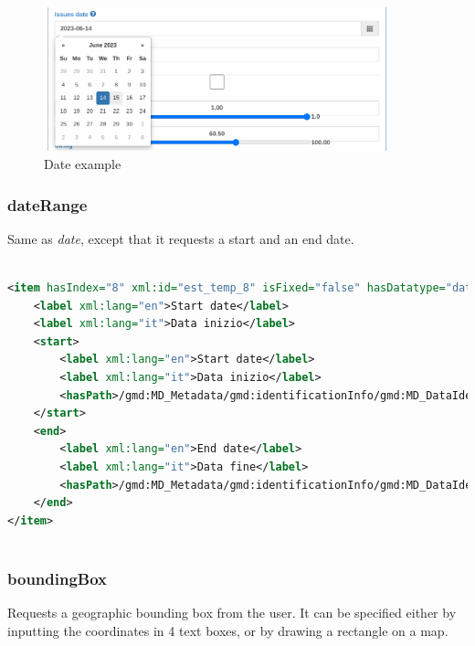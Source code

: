\documentclass[10pt]{article}
\begin{document}
\begin{figure}[h]
	\caption{Date example}
	\includegraphics[width=10cm]{Date.png}
	\centering
\end{figure}


\subsubsection{dateRange}
\label{dateRange}

Same as \textit{date}, except that it requests a start and an end date.

\begin{lstlisting}[language=xml]
	
<item hasIndex="8" xml:id="est_temp_8" isFixed="false" hasDatatype="dateRange">
	<label xml:lang="en">Start date</label>
	<label xml:lang="it">Data inizio</label>
	<start>
		<label xml:lang="en">Start date</label>
		<label xml:lang="it">Data inizio</label>
		<hasPath>/gmd:MD_Metadata/gmd:identificationInfo/gmd:MD_DataIdentification/gmd:extent/gmd:EX_Extent/gmd:temporalElement/gmd:EX_TemporalExtent/gmd:extent/gml:TimePeriod/gml:beginPosition</hasPath>
	</start>
	<end>
		<label xml:lang="en">End date</label>
		<label xml:lang="it">Data fine</label>
		<hasPath>/gmd:MD_Metadata/gmd:identificationInfo/gmd:MD_DataIdentification/gmd:extent/gmd:EX_Extent/gmd:temporalElement/gmd:EX_TemporalExtent/gmd:extent/gml:TimePeriod/gml:endPosition</hasPath>
	</end>
</item>
	
\end{lstlisting}



\subsubsection{boundingBox}
\label{boundingBox}

Requests a geographic bounding box from the user.
It can be specified either by inputting the coordinates in 4 text boxes, or by drawing a rectangle on a map.
\end{document}
